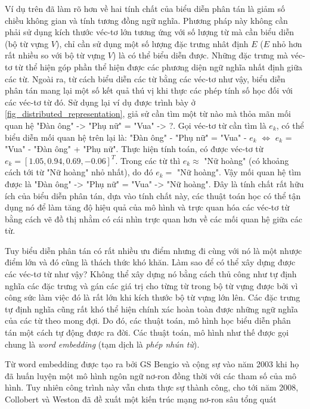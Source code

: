 Ví dụ trên đã làm rõ hơn về hai tính chất của biểu diễn phân tán là giảm số chiều không gian và tính tương đồng ngữ nghĩa. Phương pháp này không cần phải sử dụng kích thước véc-tơ lớn tương ứng với số lượng từ mà cần biểu diễn (bộ từ vựng $V$), chỉ cần sử dụng một số lượng đặc trưng nhât định $E$ ($E$ nhỏ hơn rất nhiều so với bộ từ vựng $V$) là có thể biểu diễn được. Những đặc trưng mà véc-tơ từ thể hiện góp phần thể hiện được các phương diện ngữ nghĩa nhất định giữa các từ. Ngoài ra, từ cách biểu diễn các từ bằng các véc-tơ như vậy, biểu diễn phân tán mang lại một số kết quả thú vị khi thực các phép tính số học đối với các véc-tơ từ đó. Sử dụng lại ví dụ được trình bày ở \ref{fig_distributed_representation}, giả sử cần tìm một từ nào mà thỏa mãn mối quan hệ "Đàn ông" -> "Phụ nữ" = "Vua" -> ?. 	Gọi véc-tơ từ cần tìm là $e_k$, có thể biểu diễn mối quan hệ trên lại là: "Đàn ông" - "Phụ nữ" = "Vua" - $e_k$ $\Leftrightarrow$ $e_k$ = "Vua" - "Đàn ông" + "Phụ nữ". Thực hiện tính toán, có được véc-tơ từ $e_k = \left[ 1.05, 0.94, 0.69, -0.06\right]^T$. Trong các từ thì $e_k \approx$ "Nữ hoàng" (có khoảng cách tới từ "Nữ hoàng" nhỏ nhất), do đó $e_k =$ "Nữ hoàng". Vậy mối quan hệ tìm được là "Đàn ông" -> "Phụ nữ" = "Vua" -> "Nữ hoàng". Đây là tính chất rất hữu ích của biểu diễn phân tán, dựa vào tính chất này, các thuật toán học có thể tận dụng nó để làm tăng độ hiệu quả của mô hình và trực quan hóa các véc-tơ từ bằng cách vẽ đồ thị nhằm có cái nhìn trực quan hơn về các mối quan hệ giữa các từ.

Tuy biểu diễn phân tán có rất nhiều ưu điểm nhưng đi cùng với nó là một nhược điểm lớn và đó cũng là thách thức khó khăn. Làm sao để có thể xây dựng được các véc-tơ từ như vậy? Không thể xây dựng nó bằng cách thủ công như tự định nghĩa các đặc trưng và gán các giá trị cho từng từ trong bộ từ vựng được bởi vì công sức làm việc đó là rất lớn khi kích thước bộ từ vựng lớn lên. Các đặc trưng tự định nghĩa cũng rất khó thể hiện chính xác hoàn toàn được những ngữ nghĩa của các từ theo mong đợi. Do đó, các thuật toán, mô hình học biểu diễn phân tán một cách tự động được ra đời. Các thuật toán, mô hình như thế được gọi chung là \textit{word embedding} (tạm dịch là \textit{phép nhún từ}).

Từ word embedding được tạo ra bởi GS Bengio và cộng sự vào năm 2003 \cite{wordembeddingBengio2003} khi họ đã huấn luyện một mô hình ngôn ngữ nơ-ron đồng thời với các tham số của mô hình. Tuy nhiên công trình này vẫn chưa thực sự thành công, cho tới năm 2008, Collobert và Weston \cite{wordembeddingCollobert2008} đã đề xuất một kiến trúc mạng nơ-ron sâu tổng quát

